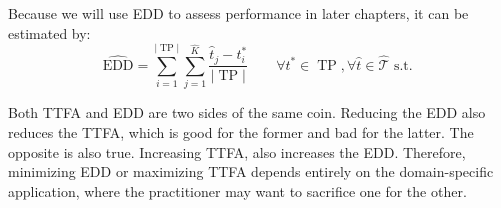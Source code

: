 Because we will use EDD to assess performance in later chapters, it can be estimated by:
\begin{equation}
\widehat{\text{EDD}} = \sum_{i=1}^{|\operatorname{TP}|} \sum_{j=1}^{\hat{K}} \frac{\hat{t}_j - t_i^*}{|\operatorname{TP}|} \quad \quad \forall t^* \in \operatorname{TP}, \forall \hat{t} \in \hat{\mathcal{T}} \text{ s.t. }
\end{equation} 

Both TTFA and EDD are two sides of the same coin. Reducing the EDD also reduces the TTFA, which is good for the former and bad for the latter. The opposite is also true. Increasing TTFA, also increases the EDD. Therefore, minimizing EDD or maximizing TTFA depends entirely on the domain-specific application, where the practitioner may want to sacrifice one for the other. 






